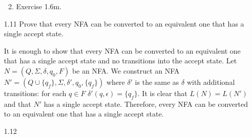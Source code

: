 \begin{enumerate}
\begin{enumerate}
\begin{figure}[H]
                    \end{figure}
              \item Exercise 1.6m.
                    \begin{figure}[H]
                        \centering
                    \end{figure}
          \end{enumerate}
          
    \item [1.11]
          Prove that every NFA can be converted to an equivalent one that has a single accept state.
          
          It is enough to show that every NFA can be converted to an equivalent one that has a single accept state and no transitions into the accept state. Let $N = (Q, \Sigma, \delta, q_0, F)$ be an NFA. We construct an NFA $N' = (Q \cup \{q_f\}, \Sigma, \delta', q_0, \{q_f\})$ where $\delta'$ is the same as $\delta$ with additional transitions: for each $q \in F$ $\delta'(q, \epsilon) = \{q_f\}$. It is clear that $L(N) = L(N')$ and that $N'$ has a single accept state. Therefore, every NFA can be converted to an equivalent one that has a single accept state.
          
    \item [1.12]
\end{enumerate}
